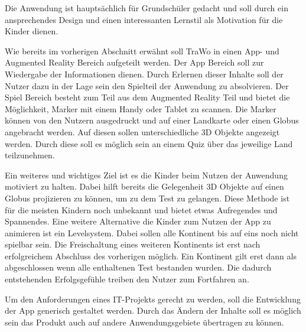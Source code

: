 Die Anwendung ist hauptsächlich für Grundschüler gedacht und soll durch ein ansprechendes Design und einen interessanten Lernstil als Motivation für die Kinder dienen.

Wie bereits im vorherigen Abschnitt erwähnt soll TraWo in einen App- und Augmented Reality Bereich aufgeteilt werden. Der App Bereich soll zur Wiedergabe der Informationen dienen. Durch Erlernen dieser Inhalte soll der Nutzer dazu in der Lage sein den Spielteil der Anwendung zu absolvieren. Der Spiel Bereich besteht zum Teil aus dem Augmented Reality Teil und bietet die Möglichkeit, Marker mit einem Handy oder Tablet zu scannen. Die Marker können von den Nutzern ausgedruckt und auf einer Landkarte oder einen Globus angebracht werden. Auf diesen sollen unterschiedliche 3D Objekte angezeigt werden. Durch diese soll es möglich sein an einem Quiz über das jeweilige Land teilzunehmen.

Ein weiteres und wichtiges Ziel ist es die Kinder beim Nutzen der Anwendung motiviert zu halten. Dabei hilft bereits die Gelegenheit 3D Objekte auf einen Globus projizieren zu können, um zu dem Test zu gelangen. Diese Methode ist für die meisten Kindern noch unbekannt und bietet etwas Aufregendes und Spannendes. Eine weitere Alternative die Kinder zum Nutzen der App zu animieren ist ein Levelsystem. Dabei sollen alle Kontinent bis auf eins noch nicht spielbar sein. Die Freischaltung eines weiteren Kontinents ist erst nach erfolgreichem Abschluss des vorherigen möglich. Ein Kontinent gilt erst dann als abgeschlossen wenn alle enthaltenen Test bestanden wurden. Die dadurch entstehenden Erfolgsgefühle treiben den Nutzer zum Fortfahren an.

Um den Anforderungen eines IT-Projekts gerecht zu werden, soll die Entwicklung der App generisch gestaltet werden. Durch das Ändern der Inhalte soll es möglich sein das Produkt auch auf andere Anwendungsgebiete übertragen zu können.

